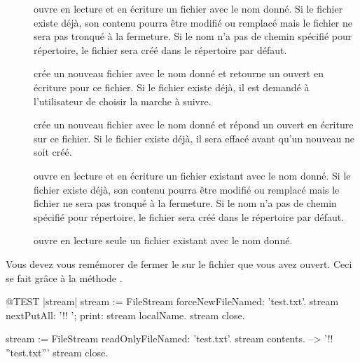 \documentclass[a4paper,10pt,twoside]{book}
\begin{document}
\begin{description}

\item[] ouvre en lecture et en écriture un fichier 
  avec le nom donné. Si le fichier existe déjà, son contenu pourra
  être modifié ou remplacé mais le fichier ne sera pas tronqué
  à la fermeture. Si le nom n'a pas de chemin spécifié pour répertoire,
  le fichier sera créé dans le répertoire par défaut.
  
\item[] crée un nouveau fichier avec le nom donné
	et retourne un \stream ouvert en écriture pour ce fichier.
	Si le fichier existe déjà, il est demandé à l'utilisateur
	de choisir la marche à suivre.
  
\item[] crée un nouveau fichier avec le nom donné
	et répond un \stream ouvert en écriture sur ce fichier.
	Si le fichier existe déjà, il sera effacé avant qu'un nouveau
	ne soit créé.

\item[] ouvre en lecture et en écriture un fichier 
	existant avec le nom donné. Si le fichier existe déjà, son 
	contenu pourra être modifié ou remplacé mais le fichier ne sera
	pas tronqué à la fermeture. Si le nom n'a pas de chemin spécifié
	pour répertoire, le fichier sera créé dans le répertoire par
	défaut.

\item[] ouvre en lecture seule un fichier 
	existant avec le nom donné.

\end{description}

Vous devez vous remémorer de fermer le \stream sur le fichier que vous avez ouvert. Ceci se fait grâce à la méthode .

\begin{code}{@TEST |stream|}
stream := FileStream forceNewFileNamed: 'test.txt'.
stream
    nextPutAll: '!! ';
    print: stream localName.
stream close.

stream := FileStream readOnlyFileNamed: 'test.txt'.
stream contents. --> '!! ''test.txt'''
stream close.
\end{code}
\end{document}
